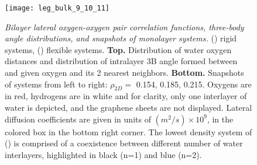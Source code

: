 \documentclass[journal=acsnano,manuscript=article]{achemso}
\begin{document}
\begin{figure}[ht!]
	\centering
	\texttt{[image: leg\_bulk\_9\_10\_11]}\\
	\caption{\textit{Bilayer lateral oxygen-oxygen pair correlation functions, three-body angle distributions, and snapshots of monolayer systems.} (\protect{}) rigid systems, (\protect{}) flexible systems. \textbf{Top.} Distribution of water oxygen distances and distribution of intralayer 3B angle formed between and given oxygen and its 2 nearest neighbors. \textbf{Bottom.} Snapshots of systems from left to right: \(\rho_{2D}=\) 0.154, 0.185, 0.215. Oxygens are in red, hydrogens are in white and for clarity, only one interlayer of water is depicted, and the graphene sheets are not displayed. Lateral diffusion coefficients are given in units of \((m^2/s) \times 10^9\), in the colored box in the bottom right corner. The lowest density system of (\protect{}) is comprised of a coexistence between different number of water interlayers, highlighted in black (n=1) and blue (n=2).}
	\label{fig:struct_9_10_11}
\end{figure}
\end{document}
